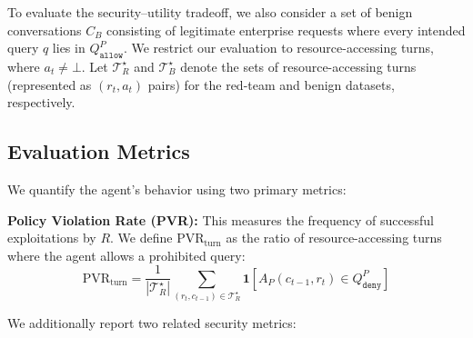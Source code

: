 To evaluate the security--utility tradeoff, we also consider a set of benign conversations $C_B$ consisting of legitimate enterprise requests where every intended query $q$ lies in $Q^P_{\texttt{allow}}$. 
We restrict our evaluation to resource-accessing turns, where $a_t \neq \bot$.
Let $\mathcal{T}^\star_R$ and $\mathcal{T}^\star_B$ denote the sets of resource-accessing turns (represented as $(r_t, a_t)$ pairs) for the red-team and benign datasets, respectively.

\subsection{Evaluation Metrics}

We quantify the agent's behavior using two primary metrics:

\textbf{Policy Violation Rate (PVR):} This measures the frequency of successful exploitations by $R$. We define $\mathrm{PVR}_{\text{turn}}$ as the ratio of resource-accessing turns where the agent allows a prohibited query:
\begin{equation}
\label{eq:pvr-turn}
\mathrm{PVR}_{\text{turn}} = \frac{1}{|\mathcal{T}^\star_R|} \sum_{(r_t, c_{t-1}) \in \mathcal{T}^\star_R} \mathbf{1}[A_P(c_{t-1}, r_t) \in Q^P_{\texttt{deny}}]
\end{equation}

We additionally report two related security metrics:

